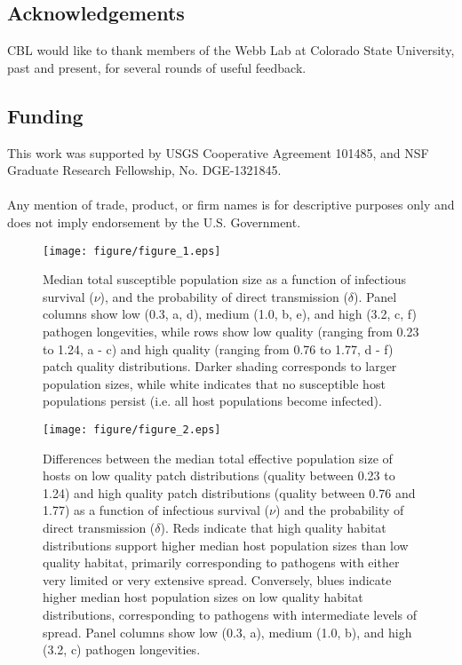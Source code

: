 \documentclass{article}
\begin{document}
\subsection*{Acknowledgements}

CBL would like to thank members of the Webb Lab at Colorado State University, past and present, for several rounds of useful feedback.  

\subsection*{Funding}

This work was supported by USGS Cooperative Agreement 101485, and NSF Graduate Research Fellowship, No. DGE-1321845.
\\
\\
Any mention of trade, product, or firm names is for descriptive purposes only and does not imply endorsement by the U.S. Government.

\clearpage

     

\clearpage

\begin{figure}
\texttt{[image: figure/figure\_1.eps]}
\caption{Median total susceptible population size as a function of infectious survival ($\nu$), and the probability of direct transmission ($\delta$).  Panel columns show low (0.3, a, d), medium (1.0, b, e), and high (3.2, c, f) pathogen longevities, while rows show low quality (ranging from 0.23 to 1.24, a - c) and high quality (ranging from 0.76 to 1.77, d - f) patch quality distributions.  Darker shading corresponds to larger population sizes, while white indicates that no susceptible host populations persist (i.e. all host populations become infected).}
\label{endemic}
\end{figure}

\begin{figure}
\texttt{[image: figure/figure\_2.eps]}
\centering
\caption{Differences between the median total effective population size of hosts on low quality patch distributions (quality between 0.23 to 1.24) and high quality patch distributions (quality between 0.76 and 1.77) as a function of infectious survival ($\nu$) and the probability of direct transmission ($\delta$).  Reds indicate that high quality habitat distributions support higher median host population sizes than low quality habitat, primarily corresponding to pathogens with either very limited or very extensive spread. Conversely, blues indicate higher median host population sizes on low quality habitat distributions, corresponding to pathogens with intermediate levels of spread.  Panel columns show low (0.3, a), medium (1.0, b), and high (3.2, c) pathogen longevities.}
\label{highvlow}
\end{figure}
\end{document}
